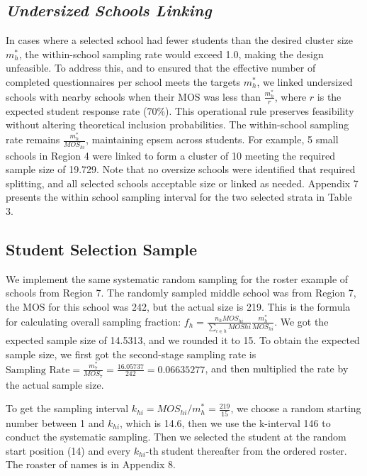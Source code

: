 \documentclass[
  12pt]{article}
\begin{document}
\subsection{\texorpdfstring{\emph{Undersized Schools
Linking}}{Undersized Schools Linking}}\label{undersized-schools-linking}

In cases where a selected school had fewer students than the desired
cluster size \(m^*_h\), the within-school sampling rate would exceed
1.0, making the design unfeasible. To address this, and to ensured that
the effective number of completed questionnaires per school meets the
targets \(m^*_h\), we linked undersized schools with nearby schools when
their MOS was less than \(\frac{m^*_h}{r}\), where \(r\) is the expected
student response rate (70\%). This operational rule preserves
feasibility without altering theoretical inclusion probabilities. The
within-school sampling rate remains \(\frac{m^*_h}{MOS_{hi}}\),
maintaining epsem across students. For example, 5 small schools in
Region 4 were linked to form a cluster of 10 meeting the required sample
size of 19.729. Note that no oversize schools were identified that
required splitting, and all selected schools acceptable size or linked
as needed. Appendix 7 presents the within school sampling interval for
the two selected strata in Table 3.

\subsection{Student Selection Sample}\label{student-selection-sample}

We implement the same systematic random sampling for the roster example
of schools from Region 7. The randomly sampled middle school was from
Region 7, the MOS for this school was 242, but the actual size is 219.
This is the formula for calculating overall sampling fraction:
\(f_h = \frac{n_h MOS_{hi} }{\sum_{i \in h} MOS{hi} } \frac{m^*_h}{MOS_{hi}}\).
We got the expected sample size of 14.5313, and we rounded it to 15. To
obtain the expected sample size, we first got the second-stage sampling
rate is
\(\text{Sampling Rate} = \frac{m^*_{7}}{MOS_7} = \frac{16.05737}{242} = 0.06635277\),
and then multiplied the rate by the actual sample size.

To get the sampling interval
\(k_{hi} = MOS_{hi} / m^*_{h} = \frac{219}{15}\), we choose a random
starting number between 1 and \(k_{hi}\), which is 14.6, then we use the
k-interval 146 to conduct the systematic sampling. Then we selected the
student at the random start position (14) and every \(k_{hi}\)-th
student thereafter from the ordered roster. The roaster of names is in
Appendix 8.
\end{document}
